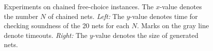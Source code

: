 \begin{figure}
    \centering
    \hspace*{10pt}
    \ourlegend
    \caption{Experiments on chained free-choice instances. The $x$-value denotes the number $N$
        of chained nets.
        \emph{Left:} The $y$-value denotes time for checking soundness of the 20 nets for each $N$.
        Marks on the gray line denote timeouts.
        \emph{Right:} The $y$-value denotes the size of generated nets.
    }\label{fig:fc-results}
\end{figure}
